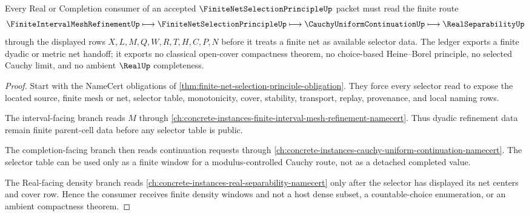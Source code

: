 \begin{theorem}
\label{thm:finite-net-selection-principle-ledger}
Every Real or Completion consumer of an accepted $\FiniteNetSelectionPrincipleUp$ packet must read the finite route
$$
\FiniteIntervalMeshRefinementUp \longmapsto \FiniteNetSelectionPrincipleUp \longmapsto \CauchyUniformContinuationUp \longmapsto \RealSeparabilityUp
$$
through the displayed rows $X,L,M,Q,W,R,T,H,C,P,N$ before it treats a finite net as available selector data. The ledger exports a finite dyadic or metric net handoff; it exports no classical open-cover compactness theorem, no choice-based Heine--Borel principle, no selected Cauchy limit, and no ambient $\RealUp$ completeness.
\end{theorem}
\begin{proof}
Start with the NameCert obligations of \autoref{thm:finite-net-selection-principle-obligation}. They force every selector read to expose the located source, finite mesh or net, selector table, monotonicity, cover, stability, transport, replay, provenance, and local naming rows.

The interval-facing branch reads $M$ through \autoref{ch:concrete-instances-finite-interval-mesh-refinement-namecert}. Thus dyadic refinement data remain finite parent-cell data before any selector table is public.

The completion-facing branch then reads continuation requests through \autoref{ch:concrete-instances-cauchy-uniform-continuation-namecert}. The selector table can be used only as a finite window for a modulus-controlled Cauchy route, not as a detached completed value.

The Real-facing density branch reads \autoref{ch:concrete-instances-real-separability-namecert} only after the selector has displayed its net centers and cover row. Hence the consumer receives finite density windows and not a host dense subset, a countable-choice enumeration, or an ambient compactness theorem.
\end{proof}




